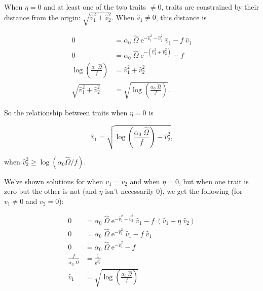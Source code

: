 When $\eta = 0$ and at least one of the two traits $\ne 0$,
traits are constrained by their distance
from the origin: $\sqrt{\hat{v}_{1}^2 + \hat{v}_{2}^2}$.
When $\hat{v}_{1} \ne 0$, this distance is

\begin{equation*}
\begin{split}
    0 &= \alpha_0 \; \hat{\Omega} \;
            \textrm{e}^{-\hat{v}_{1}^2 - \hat{v}_{2}^2} \; \hat{v}_{1}
        - f \; \hat{v}_{1} \\
    0 &= \alpha_0 \; \hat{\Omega} \;
        \textrm{e}^{- ( \hat{v}_{1}^2 + \hat{v}_{2}^2) }
        - f \\
    \log \left( \frac{\alpha_0 \; \hat{\Omega}}{ f } \right) &=
        \hat{v}_{1}^2 + \hat{v}_{2}^2 \\
     \sqrt{ \hat{v}_{1}^2 + \hat{v}_{2}^2 } &=
        \sqrt{ \log \left( \frac{\alpha_0 \; \hat{\Omega}}{ f } \right)}
    \textrm{.}
\end{split}
\end{equation*}

\noindent So the relationship between traits when $\eta = 0$ is

$$
    \hat{v}_{1} =
    \sqrt{
        \log \left( \frac{\alpha_0 \; \hat{\Omega}}{ f } \right) -
        \hat{v}_{2}^2
    }
    \textrm{,}
$$

\noindent when $\hat{v}_{2}^2 \ge \log (\alpha_0 \hat{\Omega} / f)$.

We've shown solutions for when $v_1 = v_2$ and when $\eta = 0$, but
when one trait is zero but the other is not (and $\eta$ isn't necessarily 0),
we get the following (for $v_1 \ne 0$ and $v_2 = 0$):

\begin{equation}
\begin{split}
    0 &=
        \alpha_0 \; \hat{\Omega} \;
            \textrm{e}^{-\hat{v}_{1}^2 - \hat{v}_{2}^2} \; \hat{v}_{1}
        - f \; ( \hat{v}_{1} + \eta \; \hat{v}_{2} ) \\
    0 &=
        \alpha_0 \; \hat{\Omega} \;
            \textrm{e}^{-\hat{v}_{1}^2} \; \hat{v}_{1}
        - f \; \hat{v}_{1} \\
    0 &=
        \alpha_0 \; \hat{\Omega} \;
            \textrm{e}^{-\hat{v}_{1}^2} - f \\
    \frac{f}{\alpha_0 \; \hat{\Omega}} &=
         \frac{1}{\textrm{e}^{\hat{v}_{1}^2}} \\
    \hat{v}_{1} &= \sqrt{ \log \left( \frac{\alpha_0 \; \hat{\Omega}}{f} \right) }
\end{split}
\label{eq:two-traits-v1-nonzero-v2-zero}
\end{equation}







